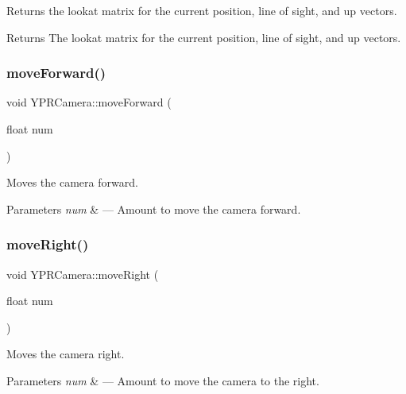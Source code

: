 Returns the lookat matrix for the current position, line of sight, and up vectors. 

\begin{DoxyReturn}{Returns}
The lookat matrix for the current position, line of sight, and up vectors. 
\end{DoxyReturn}
\mbox{\label{class_y_p_r_camera_a3fa6a8dba8cea84cabb9155b030d849e}} 
\subsubsection{\texorpdfstring{move\+Forward()}{moveForward()}}
{\footnotesize\ttfamily void Y\+P\+R\+Camera\+::move\+Forward (\begin{DoxyParamCaption}\item[{float}]{num }\end{DoxyParamCaption})}



Moves the camera forward. 


\begin{DoxyParams}{Parameters}
{\em num} & --- Amount to move the camera forward. \\
\hline
\end{DoxyParams}
\mbox{\label{class_y_p_r_camera_a477ddad236b2b2d6cb2c8a7ae60cfa53}} 
\subsubsection{\texorpdfstring{move\+Right()}{moveRight()}}
{\footnotesize\ttfamily void Y\+P\+R\+Camera\+::move\+Right (\begin{DoxyParamCaption}\item[{float}]{num }\end{DoxyParamCaption})}



Moves the camera right. 


\begin{DoxyParams}{Parameters}
{\em num} & --- Amount to move the camera to the right. \\
\hline
\end{DoxyParams}
\mbox{\label{class_y_p_r_camera_a37f3668e2f09ec2f7004d016844b468e}} 
